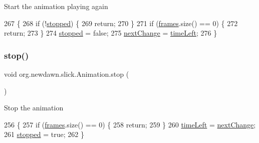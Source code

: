 Start the animation playing again 
\begin{DoxyCode}
267                         \{
268         \textcolor{keywordflow}{if} (!\mbox{\hyperlink{classorg_1_1newdawn_1_1slick_1_1_animation_ab5b77fdd8772bd15d24ea9d21fa3873d}{stopped}}) \{
269             \textcolor{keywordflow}{return};
270         \}
271         \textcolor{keywordflow}{if} (\mbox{\hyperlink{classorg_1_1newdawn_1_1slick_1_1_animation_a39f0c6a16e479985b22f7dd3bb781bf7}{frames}}.size() == 0) \{
272             \textcolor{keywordflow}{return};
273         \}
274         \mbox{\hyperlink{classorg_1_1newdawn_1_1slick_1_1_animation_ab5b77fdd8772bd15d24ea9d21fa3873d}{stopped}} = \textcolor{keyword}{false};
275         \mbox{\hyperlink{classorg_1_1newdawn_1_1slick_1_1_animation_a28280195bf1df3c929ca69b1c4d59443}{nextChange}} = \mbox{\hyperlink{classorg_1_1newdawn_1_1slick_1_1_animation_a182e85f72de3430a216564720d0139bc}{timeLeft}};
276     \}
\end{DoxyCode}
\mbox{\label{classorg_1_1newdawn_1_1slick_1_1_animation_abae71eebe022be03dc3bc696c2b1e6c1}} 
\subsubsection{\texorpdfstring{stop()}{stop()}}
{\footnotesize\ttfamily void org.\+newdawn.\+slick.\+Animation.\+stop (\begin{DoxyParamCaption}{ }\end{DoxyParamCaption})\hspace{0.3cm}{\ttfamily [inline]}}

Stop the animation 
\begin{DoxyCode}
256                        \{
257         \textcolor{keywordflow}{if} (\mbox{\hyperlink{classorg_1_1newdawn_1_1slick_1_1_animation_a39f0c6a16e479985b22f7dd3bb781bf7}{frames}}.size() == 0) \{
258             \textcolor{keywordflow}{return};
259         \}
260         \mbox{\hyperlink{classorg_1_1newdawn_1_1slick_1_1_animation_a182e85f72de3430a216564720d0139bc}{timeLeft}} = \mbox{\hyperlink{classorg_1_1newdawn_1_1slick_1_1_animation_a28280195bf1df3c929ca69b1c4d59443}{nextChange}};
261         \mbox{\hyperlink{classorg_1_1newdawn_1_1slick_1_1_animation_ab5b77fdd8772bd15d24ea9d21fa3873d}{stopped}} = \textcolor{keyword}{true};
262     \}
\end{DoxyCode}
\mbox{\label{classorg_1_1newdawn_1_1slick_1_1_animation_abc0b6beace9a12adfb11a6493afb3d4f}} 
